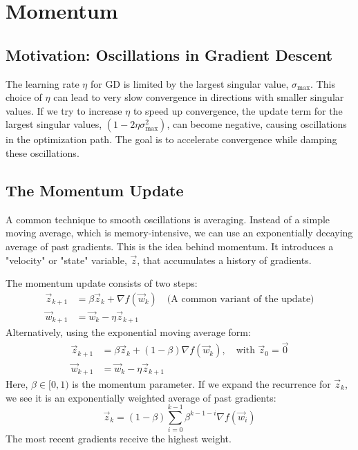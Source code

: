 \documentclass[11pt]{article}
\begin{document}
\section{Momentum}
\subsection{Motivation: Oscillations in Gradient Descent}
The learning rate $\eta$ for GD is limited by the largest singular value, $\sigma_{\max}$. This choice of $\eta$ can lead to very slow convergence in directions with smaller singular values. If we try to increase $\eta$ to speed up convergence, the update term for the largest singular values, $(1-2\eta\sigma_{\max}^2)$, can become negative, causing oscillations in the optimization path. The goal is to accelerate convergence while damping these oscillations.

\subsection{The Momentum Update}
A common technique to smooth oscillations is averaging. Instead of a simple moving average, which is memory-intensive, we can use an exponentially decaying average of past gradients. This is the idea behind momentum. It introduces a "velocity" or "state" variable, $\vec{z}$, that accumulates a history of gradients.

The momentum update consists of two steps:
\begin{align}
    \vec{z}_{k+1} &= \beta \vec{z}_k + \nabla f(\vec{w}_k) \quad \text{(A common variant of the update)}\\
    \vec{w}_{k+1} &= \vec{w}_k - \eta \vec{z}_{k+1}
\end{align}
Alternatively, using the exponential moving average form:
\begin{align}
    \vec{z}_{k+1} &= \beta \vec{z}_k + (1-\beta) \nabla f(\vec{w}_k), \quad \text{with } \vec{z}_0 = \vec{0} \\
    \vec{w}_{k+1} &= \vec{w}_k - \eta \vec{z}_{k+1}
\end{align}
Here, $\beta \in [0,1)$ is the momentum parameter. If we expand the recurrence for $\vec{z}_k$, we see it is an exponentially weighted average of past gradients:
\begin{equation}
    \vec{z}_k = (1-\beta)\sum_{i=0}^{k-1} \beta^{k-1-i} \nabla f(\vec{w}_i)
\end{equation}
The most recent gradients receive the highest weight.
\end{document}

